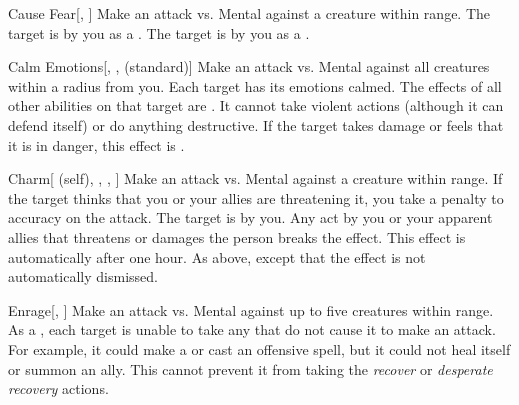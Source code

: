 \lowercase{\hypertarget{spell:Cause Fear}{}}\label{spell:Cause Fear}
\begin{ability}[\nth{1}]{\hypertarget{spell:Cause Fear}{Cause Fear}}[, ]
Make an attack vs. Mental against a creature within \rngmed range.
\hit The target is \frightened by you as a .
\crit The target is \panicked by you as a .
\end{ability}
\vspace{0.25em}



\lowercase{\hypertarget{spell:Calm Emotions}{}}\label{spell:Calm Emotions}
\begin{ability}[\nth{2}]{\hypertarget{spell:Calm Emotions}{Calm Emotions}}[, ,  (standard)]
Make an attack vs. Mental against all creatures within a \areamed radius from you.
\hit Each target has its emotions calmed.
The effects of all other  abilities on that target are .
It cannot take violent actions (although it can defend itself) or do anything destructive.
If the target takes damage or feels that it is in danger, this effect is .
\end{ability}
\vspace{0.25em}



\lowercase{\hypertarget{spell:Charm}{}}\label{spell:Charm}
\begin{ability}[\nth{2}]{\hypertarget{spell:Charm}{Charm}}[ (self), , , ]
Make an attack vs. Mental against a creature within \rngmed range.
If the target thinks that you or your allies are threatening it, you take a  penalty to accuracy on the attack.
\hit The target is \charmed by you.
Any act by you or your apparent allies that threatens or damages the  person breaks the effect.
This effect is automatically  after one hour.
\crit As above, except that the effect is not automatically dismissed.
\end{ability}
\vspace{0.25em}



\lowercase{\hypertarget{spell:Enrage}{}}\label{spell:Enrage}
\begin{ability}[\nth{2}]{\hypertarget{spell:Enrage}{Enrage}}[, ]
Make an attack vs. Mental against up to five creatures within \rngmed range.
\hit As a , each target is unable to take any  that do not cause it to make an attack.
For example, it could make a  or cast an offensive spell, but it could not heal itself or summon an ally.
This cannot prevent it from taking the \textit{recover} or \textit{desperate recovery} actions.
\end{ability}
\vspace{0.25em}



